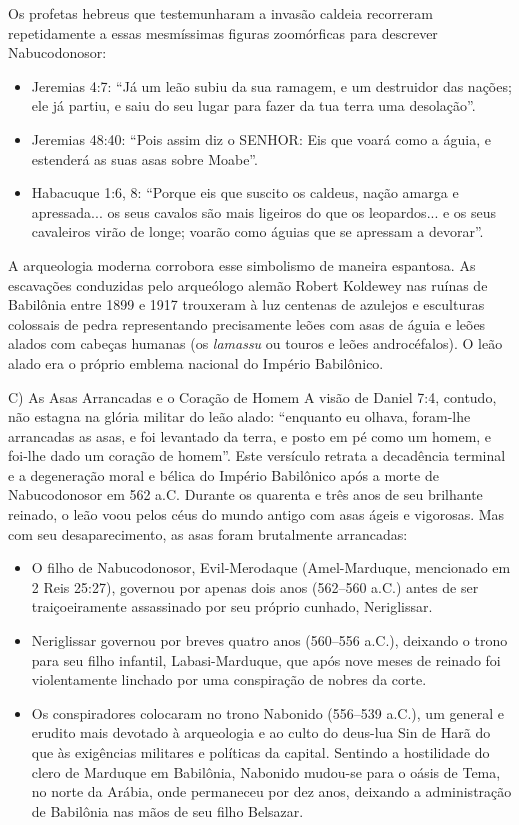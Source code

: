 \documentclass[11pt,a4paper,openany]{book}
\begin{document}
Os profetas hebreus que testemunharam a invasão caldeia recorreram repetidamente a essas mesmíssimas figuras zoomórficas para descrever Nabucodonosor:
\begin{itemize}
  \item Jeremias 4:7: ``Já um leão subiu da sua ramagem, e um destruidor das nações; ele já partiu, e saiu do seu lugar para fazer da tua terra uma desolação''.
  \item Jeremias 48:40: ``Pois assim diz o SENHOR: Eis que voará como a águia, e estenderá as suas asas sobre Moabe''.
  \item Habacuque 1:6, 8: ``Porque eis que suscito os caldeus, nação amarga e apressada... os seus cavalos são mais ligeiros do que os leopardos... e os seus cavaleiros virão de longe; voarão como águias que se apressam a devorar''.
\end{itemize}


A arqueologia moderna corrobora esse simbolismo de maneira espantosa. As escavações conduzidas pelo arqueólogo alemão Robert Koldewey nas ruínas de Babilônia entre 1899 e 1917 trouxeram à luz centenas de azulejos e esculturas colossais de pedra representando precisamente leões com asas de águia e leões alados com cabeças humanas (os \textit{lamassu} ou touros e leões androcéfalos). O leão alado era o próprio emblema nacional do Império Babilônico.

C) As Asas Arrancadas e o Coração de Homem
A visão de Daniel 7:4, contudo, não estagna na glória militar do leão alado: ``enquanto eu olhava, foram-lhe arrancadas as asas, e foi levantado da terra, e posto em pé como um homem, e foi-lhe dado um coração de homem''.
Este versículo retrata a decadência terminal e a degeneração moral e bélica do Império Babilônico após a morte de Nabucodonosor em 562 a.C. Durante os quarenta e três anos de seu brilhante reinado, o leão voou pelos céus do mundo antigo com asas ágeis e vigorosas. Mas com seu desaparecimento, as asas foram brutalmente arrancadas:
\begin{itemize}
  \item O filho de Nabucodonosor, Evil-Merodaque (Amel-Marduque, mencionado em 2 Reis 25:27), governou por apenas dois anos (562–560 a.C.) antes de ser traiçoeiramente assassinado por seu próprio cunhado, Neriglissar.
  \item Neriglissar governou por breves quatro anos (560–556 a.C.), deixando o trono para seu filho infantil, Labasi-Marduque, que após nove meses de reinado foi violentamente linchado por uma conspiração de nobres da corte.
  \item Os conspiradores colocaram no trono Nabonido (556–539 a.C.), um general e erudito mais devotado à arqueologia e ao culto do deus-lua Sin de Harã do que às exigências militares e políticas da capital. Sentindo a hostilidade do clero de Marduque em Babilônia, Nabonido mudou-se para o oásis de Tema, no norte da Arábia, onde permaneceu por dez anos, deixando a administração de Babilônia nas mãos de seu filho Belsazar.
\end{itemize}
\end{document}
